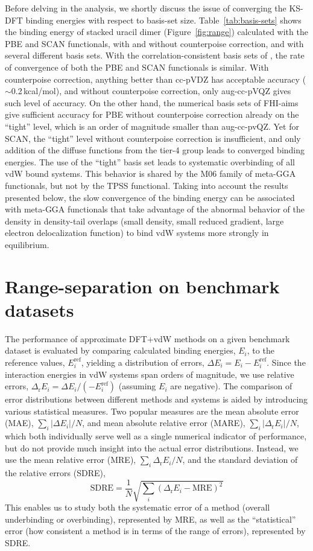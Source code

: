 Before delving in the analysis, we shortly discuss the issue of converging the KS-DFT binding energies with respect to basis-set size.
Table~\ref{tab:basis-sets} shows the binding energy of stacked uracil dimer (Figure~\ref{fig:range}) calculated with the PBE and SCAN functionals, with and without counterpoise correction, and with several different basis sets.
With the correlation-consistent basis sets of \citet{DunningJCP89}, the rate of convergence of both the PBE and SCAN functionals is similar.
With counterpoise correction, anything better than cc-pVDZ has acceptable accuracy ($\sim$0.2\,kcal/mol), and without counterpoise correction, only aug-cc-pVQZ gives such level of accuracy.
On the other hand, the numerical basis sets of FHI-aims give sufficient accuracy for PBE without counterpoise correction already on the ``tight'' level, which is an order of magnitude smaller than aug-cc-pvQZ\@.
Yet for SCAN, the ``tight'' level without counterpoise correction is insufficient, and only addition of the diffuse functions from the tier-4 group leads to converged binding energies.
The use of the ``tight'' basis set leads to systematic overbinding of all vdW bound systems.
This behavior is shared by the M06 family of meta-GGA functionals, but not by the TPSS functional.
Taking into account the results presented below, the slow convergence of the binding energy can be associated with meta-GGA functionals that take advantage of the abnormal behavior of the density in density-tail overlaps (small density, small reduced gradient, large electron delocalization function) to bind vdW systems more strongly in equilibrium.

\section{Range-separation on benchmark datasets}

The performance of approximate DFT+vdW methods on a given benchmark dataset is evaluated by comparing calculated binding energies, $E_i$, to the reference values, $E_i^\text{ref}$, yielding a distribution of errors, $\Delta E_i=E_i-E_i^\text{ref}$.
Since the interaction energies in vdW systems span orders of magnitude, we use relative errors, $\Delta_\mathrm rE_i=\Delta E_i/(-E_i^\text{ref})$ (assuming $E_i$ are negative).
The comparison of error distributions between different methods and systems is aided by introducing various statistical measures.
Two popular measures are the mean absolute error (MAE), $\sum_i\lvert\Delta E_i\rvert/N$, and mean absolute relative error (MARE), $\sum_i\lvert\Delta_\mathrm rE_i\rvert/N$, which both individually serve well as a single numerical indicator of performance, but do not provide much insight into the actual error distributions.
Instead, we use the mean relative error (MRE), $\sum_i\Delta_\mathrm rE_i/N$, and the standard deviation of the relative errors (SDRE),
\[ \text{SDRE}=\frac1N\sqrt{\sum_i(\Delta_\mathrm rE_i-\text{MRE})^2} \]
This enables us to study both the systematic error of a method (overall underbinding or overbinding), represented by MRE, as well as the ``statistical'' error (how consistent a method is in terms of the range of errors), represented by SDRE\@.

